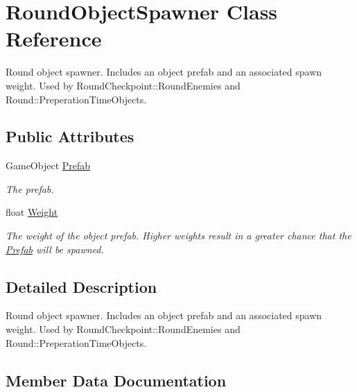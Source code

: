 \hypertarget{class_round_object_spawner}{}\section{Round\+Object\+Spawner Class Reference}
\label{class_round_object_spawner}


Round object spawner. Includes an object prefab and an associated spawn weight. Used by Round\+Checkpoint\+::\+Round\+Enemies and Round\+::\+Preperation\+Time\+Objects.  


\subsection*{Public Attributes}
\begin{DoxyCompactItemize}
\item 
Game\+Object \hyperlink{class_round_object_spawner_aabf387fad5a54de659b38f89f0b47b98}{Prefab}
\begin{DoxyCompactList}\small\item\em The prefab. \end{DoxyCompactList}\item 
float \hyperlink{class_round_object_spawner_a4a8acea590e65b61ecf992895306cccc}{Weight}
\begin{DoxyCompactList}\small\item\em The weight of the object prefab. Higher weights result in a greater chance that the \hyperlink{class_round_object_spawner_aabf387fad5a54de659b38f89f0b47b98}{Prefab} will be spawned. \end{DoxyCompactList}\end{DoxyCompactItemize}


\subsection{Detailed Description}
Round object spawner. Includes an object prefab and an associated spawn weight. Used by Round\+Checkpoint\+::\+Round\+Enemies and Round\+::\+Preperation\+Time\+Objects. 



\subsection{Member Data Documentation}
\hypertarget{class_round_object_spawner_aabf387fad5a54de659b38f89f0b47b98}{}
